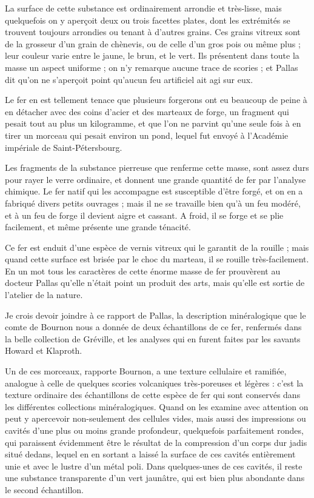 \documentclass[a4paper, 12pt, oneside, french]{article}
\begin{document}
La surface de cette substance est ordinairement arrondie et très-lisse, mais quelquefois on y aperçoit deux ou trois facettes plates, dont les extrémités se trouvent toujours arrondies ou tenant à d'autres grains. Ces grains vitreux sont de la grosseur d'un grain de chènevis, ou de celle d'un gros pois ou même plus ; leur couleur varie entre le jaune, le brun, et le vert. Ils présentent dans toute la masse un aspect uniforme ; on n'y remarque aucune trace de scories ; et Pallas dit qu'on ne s'aperçoit point qu'aucun feu artificiel ait agi sur eux.

Le fer en est tellement tenace que plusieurs forgerons ont eu beaucoup de peine à en détacher avec des coins d'acier et des marteaux de forge, un fragment qui pesait tout au plus un kilogramme, et que l'on ne parvint qu'une seule fois à en tirer un morceau qui pesait environ un pond, lequel fut envoyé à l'Académie impériale de Saint-Pétersbourg.

Les fragments de la substance pierreuse que renferme cette masse, sont assez durs pour rayer le verre ordinaire, et donnent une grande quantité de fer par l'analyse chimique. Le fer natif qui les accompagne est susceptible d'être forgé, et on en a fabriqué divers petits ouvrages ; mais il ne se travaille bien qu'à un feu modéré, et à un feu de forge il devient aigre et cassant. A froid, il se forge et se plie facilement, et même présente une grande ténacité.

Ce fer est enduit d'une espèce de vernis vitreux qui le garantit de la rouille ; mais quand cette surface est brisée par le choc du marteau, il se rouille très-facilement. En un mot tous les caractères de cette énorme masse de fer prouvèrent au docteur Pallas qu'elle n'était point un produit des arts, mais qu'elle est sortie de l'atelier de la nature.

Je crois devoir joindre à ce rapport de Pallas, la description minéralogique que le comte de Bournon nous a donnée de deux échantillons de ce fer, renfermés dans la belle collection de Gréville, et les analyses qui en furent faites par les savants Howard et Klaproth.

Un de ces morceaux, rapporte Bournon, a une texture cellulaire et ramifiée, analogue à celle de quelques scories volcaniques très-poreuses et légères : c'est la texture ordinaire des échantillons de cette espèce de fer qui sont conservés dans les différentes collections minéralogiques. Quand on les examine avec attention on peut y apercevoir non-seulement des cellules vides, mais aussi des impressions ou cavités d'une plus ou moins grande profondeur, quelquefois parfaitement rondes, qui paraissent évidemment être le résultat de la compression d'un corps dur jadis situé dedans, lequel en en sortant a laissé la surface de ces cavités entièrement unie et avec le lustre d'un métal poli. Dans quelques-unes de ces cavités, il reste une substance transparente d'un vert jaunâtre, qui est bien plus abondante dans le second échantillon.
\end{document}
